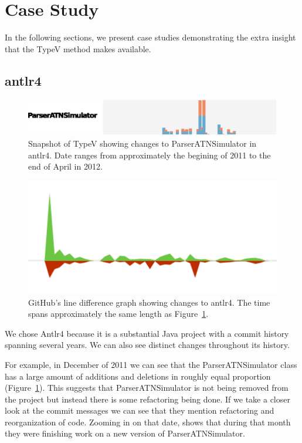 \documentclass[conference]{IEEEtran}
\begin{document}
\section{Case Study}

In the following sections, we present case studies demonstrating the extra insight that the TypeV method makes available.

\subsection{antlr4}

\begin{figure}[!ht]
\centering
\includegraphics[width=\columnwidth]{ParserATNSimulator}
\caption{Snapshot of TypeV showing changes to ParserATNSimulator in antlr4. Date ranges from approximately the begining of 2011 to the end of April in 2012.}
\label{fig:parser1}
\end{figure}

\begin{figure}[!ht]
\centering
\includegraphics[width=\columnwidth]{Antlr4-GH-Lines-ParserATNSimulator}
\caption{GitHub's line difference graph showing changes to antlr4. The time spans approximately the same length as Figure~\ref{fig:parser1}.}
\label{fig:parser2}
\end{figure}

We chose Antlr4 because it is a substantial Java project with a commit history spanning several years. We can also see distinct changes throughout its history.

For example, in December of 2011 we can see that the ParserATNSimulator class has a large amount of additions and deletions in roughly equal proportion (Figure~\ref{fig:parser1}). This suggests that ParserATNSimulator is not being removed from the project but instead there is some refactoring being done. If we take a closer look at the commit messages we can see that they mention refactoring and reorganization of code. Zooming in on that date,  shows that during that month they were finishing work on a new version of ParserATNSimulator.
\end{document}
